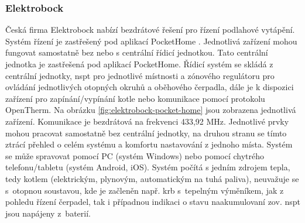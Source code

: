 \subsubsection{Elektrobock}
Česká firma Elektrobock \cite{elektrobock-stranky} nabízí bezdrátové řešení pro řízení podlahové vytápění. Systém řízení je zastřešený pod aplikací PocketHome \cite{pockethome-stranky}. Jednotlivá zařízení mohou fungovat samostatně bez nebo s centrální řídicí jednotkou. Tato centrální jednotka je zastřešená pod aplikací PocketHome. Řídicí systém se skládá z centrální jednotky, \acrshort{nspt} pro jednotlivé místnosti a zónového regulátoru pro ovládání jednotlivých otopných okruhů a oběhového čerpadla, dále je k dispozici zařízení pro zapínání/vypínání kotle nebo komunikace pomocí protokolu OpenTherm. Na obrázku \ref{fig:elektrobock-pocket-home} jsou zobrazena jednotlivá zařízení. Komunikace je bezdrátová na frekvenci 433,92 MHz. Jednotlivé prvky mohou pracovat samostatně bez centrální jednotky, na druhou stranu se tímto ztrácí přehled o celém systému a komfortu nastavování z jednoho místa. Systém se může spravovat pomocí PC (systém Windows) nebo pomocí chytrého telefonu/tabletu (systém Android, iOS). Systém počítá s jedním zdrojem tepla, tedy kotlem (elektrickým, plynovým, automatickým na tuhá paliva), neuvažuje se s~otopnou soustavou, kde je začleněn např. krb s~tepelným výměníkem, jak z pohledu řízení čerpadel, tak i případnou indikaci o stavu  naakumulovaní \acrshort{zov}. \acrshort{nspt} jsou napájeny z~baterií.


